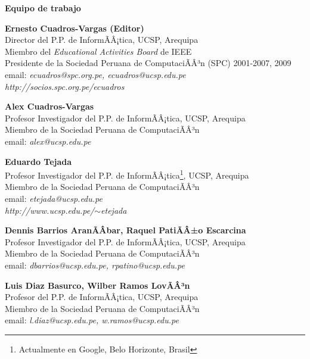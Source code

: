 \begin{center}
{\bf \Huge Equipo de trabajo}
\end{center}
\vspace{1cm}

\begin{center}
\textbf{Ernesto Cuadros-Vargas (Editor)}\\
Director del P.P. de InformÃÂ¡tica, UCSP, Arequipa\\
Miembro del \textit{Educational Activities Board} de IEEE\\
Presidente de la Sociedad Peruana de ComputaciÃÂ³n (SPC) 2001-2007, 2009\\
email: \textit{ecuadros@spc.org.pe, ecuadros@ucsp.edu.pe}\\
\textit{http://socios.spc.org.pe/ecuadros}
\end{center}

\begin{center}
\textbf{Alex Cuadros-Vargas}\\
Profesor Investigador del P.P. de InformÃÂ¡tica, UCSP, Arequipa\\
Miembro de la Sociedad Peruana de ComputaciÃÂ³n\\
email: \textit{alex@ucsp.edu.pe}\\
\end{center}

\begin{center}
\textbf{Eduardo Tejada}\\
Profesor Investigador del P.P. de InformÃÂ¡tica\footnote{Actualmente en Google, Belo Horizonte, Brasil}, UCSP, Arequipa\\
Miembro de la Sociedad Peruana de ComputaciÃÂ³n\\
email: \textit{etejada@ucsp.edu.pe}\\
\textit{http://www.ucsp.edu.pe/$\sim$etejada}
\end{center}

\begin{center}
\textbf{Dennis Barrios AranÃÂ­bar, Raquel PatiÃÂ±o Escarcina}\\
Profesor Investigador del P.P. de InformÃÂ¡tica, UCSP, Arequipa\\
Miembro de la Sociedad Peruana de ComputaciÃÂ³n\\
email: \textit{dbarrios@ucsp.edu.pe, rpatino@ucsp.edu.pe}
\end{center}

\begin{center}
\textbf{Luis Diaz Basurco, Wilber Ramos LovÃÂ³n}\\
Profesor del P.P. de InformÃÂ¡tica, UCSP, Arequipa\\
Miembro de la Sociedad Peruana de ComputaciÃÂ³n\\
email: \textit{l.diaz@ucsp.edu.pe, w.ramos@ucsp.edu.pe}
\end{center}


